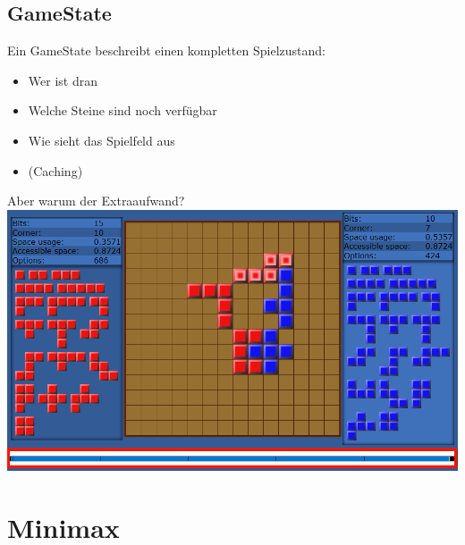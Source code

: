 \documentclass[12pt, draft]{beamer}
\begin{document}
\subsection{GameState}
\begin{frame}
	Ein GameState beschreibt einen kompletten Spielzustand:
	\begin{itemize}
		\item Wer ist dran
		\item Welche Steine sind noch verfügbar
		\item Wie sieht das Spielfeld aus
		\item (Caching)
	\end{itemize}
\end{frame}
\begin{frame}
	Aber warum der Extraaufwand?\\ \vspace*{5pt}
	\includegraphics[width=\linewidth]{media/gamestate1.png}
\end{frame}

\section{Minimax}
\end{document}
